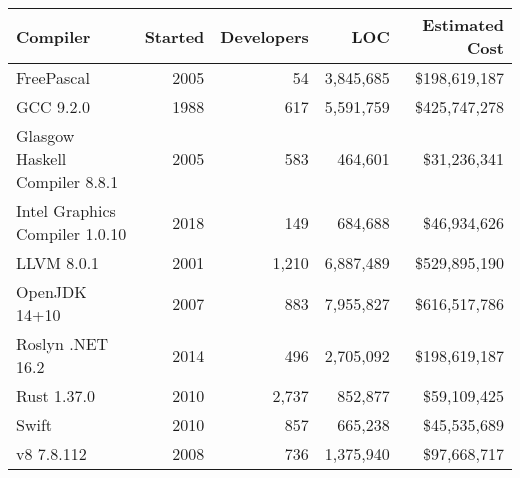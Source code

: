 \begin{tabular}{ | L{3.5cm} r r r r |}
  \hline
  \textbf{Compiler} & \textbf{Started} & \textbf{Developers} & \textbf{LOC} & \textbf{Estimated Cost} \\
  \hline
  FreePascal & 2005 & 54 & 3,845,685 & \$198,619,187 \\
  GCC 9.2.0 & 1988 & 617 & 5,591,759 & \$425,747,278 \\
  Glasgow Haskell Compiler 8.8.1 & 2005 & 583 & 464,601 & \$31,236,341 \\
  Intel Graphics Compiler 1.0.10 & 2018 & 149 & 684,688 & \$46,934,626 \\
  LLVM 8.0.1 & 2001 & 1,210 & 6,887,489 & \$529,895,190 \\
  OpenJDK 14+10 & 2007 & 883 & 7,955,827 & \$616,517,786 \\
  Roslyn .NET 16.2 & 2014 & 496 & 2,705,092 & \$198,619,187 \\
  Rust 1.37.0 & 2010 & 2,737 & 852,877 & \$59,109,425\\
  Swift & 2010 & 857 & 665,238 & \$45,535,689 \\
  v8 7.8.112 & 2008 & 736 & 1,375,940 & \$97,668,717\\
  \hline
\end{tabular}
